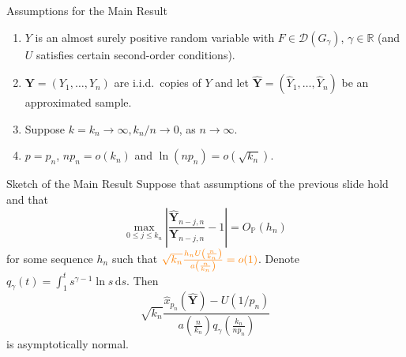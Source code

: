 \documentclass{beamer}
\begin{document}

\begin{frame}{Assumptions for the Main Result}
  \begin{enumerate}
    \item $Y$ is an almost surely positive random variable with $F\in
	  \mathcal{D}\left(G_\gamma\right)$, $\gamma\in\mathbb{R}$ (and $U$ satisfies
	  certain second-order conditions).
    \item $\bm Y = \left(Y_1, \ldots, Y_n\right)$ are i.i.d.\ copies of $Y$ and
	  let $\hat{\bm Y} = (\hat Y_1, \ldots, \hat Y_n)$ be an approximated sample.
    \pause
    \item Suppose $k = k_n\to\infty, k_n/n\to 0$, as $n\to\infty$.
    \item $p = p_n$, $np_n = o\left(k_n\right)$ and $\ln\left(np_n\right) =
		o\left(\sqrt{k_n}\right)$.
  \end{enumerate}
\end{frame}


\begin{frame}{Sketch of the Main Result}
	Suppose that assumptions of the previous slide hold and that
	\begin{equation*}
		\max_{0\leq j\leq k_n} \left|\frac{\hat{\bm Y}_{n-j,n}}
		{\bm Y_{n-j,n}} - 1\right|
		= O_\mathbb{P}\left(h_n\right)
	\end{equation*}
	for some sequence $h_n$ such that  $\textcolor{orange}{\sqrt{k_n}
	\frac{h_nU\left(\frac{n}{k_n}\right)}{a\left(\frac{n}{k_n}\right)} = o(1)}$.
	Denote $q_\gamma\left(t\right) = \int_1^t s^{\gamma - 1}\ln s \, \mathrm{d}s$.
	Then
  \begin{equation*}
    \sqrt{k_n}\frac{\hat x_{p_n}(\hat{\bm Y})
		- U\left(1/p_n\right)}{a\left(\frac{n}{k_n}\right)
		q_\gamma\left(\frac{k_n}{np_n}\right)}
  \end{equation*}
  is asymptotically normal.
\end{frame}

\end{document}
